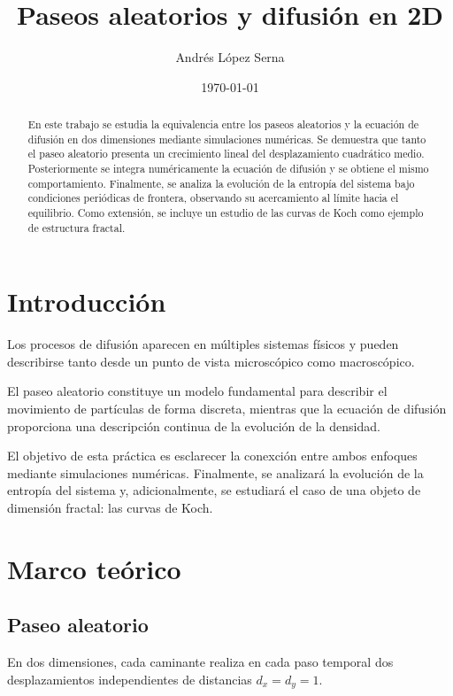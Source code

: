 \documentclass[11pt,a4paper]{article}
\title{Paseos aleatorios y difusión en 2D}
\author{Andrés López Serna}
\date{\today}
\begin{document}
\maketitle

\begin{abstract}

En este trabajo se estudia la equivalencia entre los paseos aleatorios y la ecuación de difusión en dos dimensiones mediante simulaciones numéricas. Se demuestra que tanto el paseo aleatorio presenta un crecimiento lineal del desplazamiento cuadrático medio. Posteriormente se integra numéricamente la ecuación de difusión y se obtiene el mismo comportamiento. Finalmente, se analiza la evolución de la entropía del sistema bajo condiciones periódicas de frontera, observando su acercamiento al límite hacia el equilibrio. Como extensión, se incluye un estudio de las curvas de Koch como ejemplo de estructura fractal.

\end{abstract}

\section{Introducción}

Los procesos de difusión aparecen en múltiples sistemas físicos y pueden describirse tanto desde un punto de vista microscópico como macroscópico.

El paseo aleatorio constituye un modelo fundamental para describir el movimiento de partículas de forma discreta, mientras que la ecuación de difusión proporciona una descripción continua de la evolución de la densidad.

El objetivo de esta práctica es esclarecer la conexción entre ambos enfoques mediante simulaciones numéricas. Finalmente, se analizará la evolución de la entropía del sistema y, adicionalmente, se estudiará el caso de una objeto de dimensión fractal: las curvas de Koch.

\section{Marco teórico}

\subsection{Paseo aleatorio}

En dos dimensiones, cada caminante realiza en cada paso temporal dos desplazamientos independientes de distancias $d_x= d_y = 1$.
\end{document}
